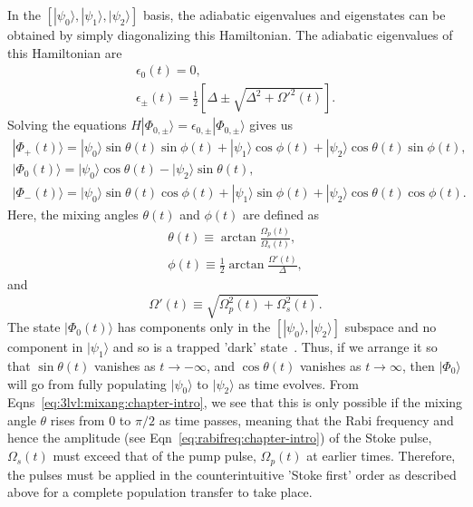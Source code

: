 In the $\left[ |\psi_0\rangle, |\psi_1\rangle, |\psi_2\rangle  \right]$ basis, the adiabatic eigenvalues and eigenstates can be obtained by simply diagonalizing this Hamiltonian. The adiabatic eigenvalues of this Hamiltonian are
\begin{eqnarray}
\epsilon_0(t)=0, \nonumber \\
\epsilon_{\pm}(t) = \frac{1}{2}\left[ \Delta \pm \sqrt{\Delta^2 + \Omega'^2(t)}\right]. 
\label{eq:3lvl:evals:chapter-intro}
\end{eqnarray}
Solving the equations $H |\Phi_{0,\pm}\rangle = \epsilon_{0,\pm} |\Phi_{0,\pm}\rangle$ gives us
\begin{eqnarray}
|\Phi_+(t)\rangle = |\psi_0\rangle \sin{\theta(t)}\sin{\phi(t)} + |\psi_1\rangle \cos{\phi(t)}+|\psi_2\rangle \cos{\theta(t)}\sin{\phi(t)}, \nonumber \\
|\Phi_0(t)\rangle=|\psi_0\rangle \cos{\theta(t)} -|\psi_2\rangle \sin{\theta(t)}, \nonumber \\
|\Phi_-(t)\rangle = |\psi_0\rangle \sin{\theta(t)}\cos{\phi(t)} + |\psi_1\rangle \sin{\phi(t)}+|\psi_2\rangle \cos{\theta(t)}\cos{\phi(t)}.
\label{eq:3lvl:stirap:estates:chapter-intro}
\end{eqnarray}
Here, the mixing angles $\theta(t)$ and $\phi(t)$ are defined as
\begin{eqnarray}
\theta(t) \equiv \arctan{\frac{\Omega_p(t)}{\Omega_s(t)}}, \nonumber \\
\phi(t) \equiv \frac{1}{2} \arctan{\frac{\Omega'(t)}{\Delta}},
\label{eq:3lvl:mixang:chapter-intro}
\end{eqnarray}
and 
\begin{equation}
\Omega'(t)\equiv \sqrt{\Omega^2_p(t) + \Omega^2_s(t)}.
\label{eq:3lvl:omegap:chapter-intro}
\end{equation}
The state $|\Phi_0(t)\rangle$ has components only in the $\left[ |\psi_0\rangle , |\psi_2\rangle \right]$ subspace and no component in $|\psi_1\rangle$ and so is a trapped 'dark' state~\cite{stirap:review}. Thus, if we arrange it so that $\sin{\theta(t)}$ vanishes as $t \rightarrow -\infty$, and $\cos{\theta(t)}$ vanishes as $t \rightarrow \infty$, then $|\Phi_0\rangle$ will go from fully populating $|\psi_0\rangle$ to $|\psi_2\rangle$ as time evolves. From Eqns~\ref{eq:3lvl:mixang:chapter-intro}, we see that this is only possible if the mixing angle $\theta$ rises from $0$ to $\pi/2$ as time passes, meaning that the Rabi frequency and hence the amplitude (see Eqn~\ref{eq:rabifreq:chapter-intro}) of the Stoke pulse, $\Omega_s(t)$ must exceed that of the pump pulse, $\Omega_p(t)$ at earlier times. Therefore, the pulses must be applied in the counterintuitive 'Stoke first' order as described above for a complete population transfer to take place.

